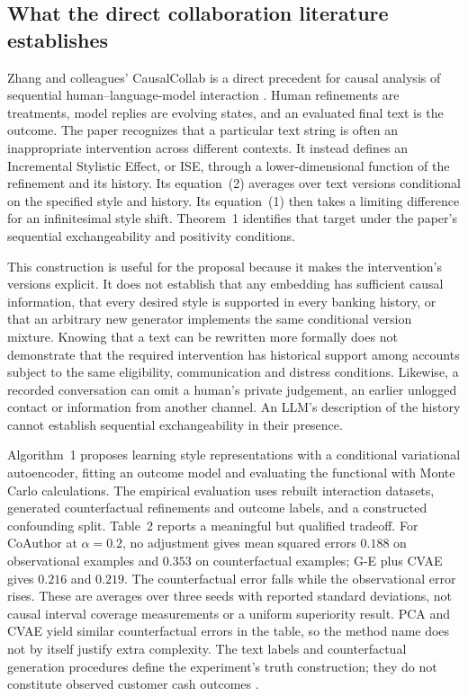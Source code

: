 \subsection{What the direct collaboration literature establishes}

Zhang and colleagues' CausalCollab is a direct precedent for causal analysis
of sequential human--language-model interaction
\citep{exec13_census_collaboration}. Human refinements are treatments,
model replies are evolving states, and an evaluated final text is the
outcome. The paper recognizes that a particular text string is often an
inappropriate intervention across different contexts. It instead defines an
Incremental Stylistic Effect, or ISE, through a lower-dimensional function
of the refinement and its history. Its equation~(2) averages over text
versions conditional on the specified style and history. Its equation~(1)
then takes a limiting difference for an infinitesimal style shift.
Theorem~1 identifies that target under the paper's sequential
exchangeability and positivity conditions.

This construction is useful for the proposal because it makes the
intervention's versions explicit. It does not establish that any
embedding has sufficient causal information, that every desired style is
supported in every banking history, or that an arbitrary new generator
implements the same conditional version mixture.
Knowing that a text can be rewritten more formally does not demonstrate
that the required intervention has historical support among accounts
subject to the same eligibility, communication and distress conditions.
Likewise, a recorded conversation can omit a human's private judgement,
an earlier unlogged contact or information from another channel.
An LLM's description of the history cannot establish sequential
exchangeability in their presence.

Algorithm~1 proposes learning style representations with a conditional
variational autoencoder, fitting an outcome model and evaluating the
functional with Monte Carlo calculations.
The empirical evaluation uses rebuilt interaction datasets, generated
counterfactual refinements and outcome labels, and a constructed
confounding split. Table~2 reports a meaningful but qualified tradeoff.
For CoAuthor at $\alpha=0.2$, no adjustment gives mean squared errors
$0.188$ on observational examples and $0.353$ on counterfactual examples;
G-E plus CVAE gives $0.216$ and $0.219$. The counterfactual error falls
while the observational error rises. These are averages over three seeds
with reported standard deviations, not causal interval coverage
measurements or a uniform superiority result. PCA and CVAE yield similar
counterfactual errors in the table, so the method name does not by itself
justify extra complexity. The text labels and counterfactual generation
procedures define the experiment's truth construction; they do not
constitute observed customer cash outcomes
\citep{exec13_census_collaboration}.

